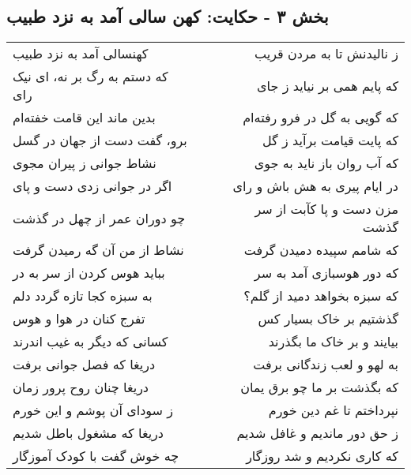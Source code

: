 \begin{center}
\section*{بخش ۳ - حکایت: کهن سالی آمد به نزد طبیب}
\label{sec:003}
\begin{longtable}{l p{0.5cm} r}
کهنسالی آمد به نزد طبیب
&&
ز نالیدنش تا به مردن قریب
\\
که دستم به رگ بر نه، ای نیک رای
&&
که پایم همی بر نیاید ز جای
\\
بدین ماند این قامت خفته‌ام
&&
که گویی به گل در فرو رفته‌ام
\\
برو، گفت دست از جهان در گسل
&&
که پایت قیامت برآید ز گل
\\
نشاط جوانی ز پیران مجوی
&&
که آب روان باز ناید به جوی
\\
اگر در جوانی زدی دست و پای
&&
در ایام پیری به هش باش و رای
\\
چو دوران عمر از چهل در گذشت
&&
مزن دست و پا کآبت از سر گذشت
\\
نشاط از من آن گه رمیدن گرفت
&&
که شامم سپیده دمیدن گرفت
\\
بباید هوس کردن از سر به در
&&
که دور هوسبازی آمد به سر
\\
به سبزه کجا تازه گردد دلم
&&
که سبزه بخواهد دمید از گلم؟
\\
تفرج کنان در هوا و هوس
&&
گذشتیم بر خاک بسیار کس
\\
کسانی که دیگر به غیب اندرند
&&
بیایند و بر خاک ما بگذرند
\\
دریغا که فصل جوانی برفت
&&
به لهو و لعب زندگانی برفت
\\
دریغا چنان روح پرور زمان
&&
که بگذشت بر ما چو برق یمان
\\
ز سودای آن پوشم و این خورم
&&
نپرداختم تا غم دین خورم
\\
دریغا که مشغول باطل شدیم
&&
ز حق دور ماندیم و غافل شدیم
\\
چه خوش گفت با کودک آموزگار
&&
که کاری نکردیم و شد روزگار
\\
\end{longtable}
\end{center}
